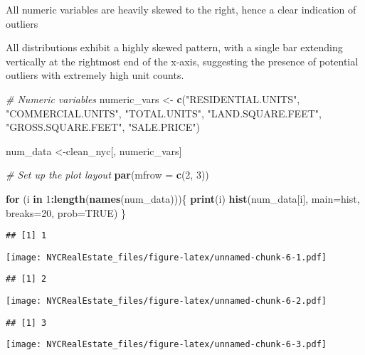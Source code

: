 \documentclass[
]{article}
\newenvironment{Shaded}{\begin{snugshade}}{\end{snugshade}}
\newcommand{\AttributeTok}[1]{\textcolor[rgb]{0.13,0.29,0.53}{#1}}
\newcommand{\CommentTok}[1]{\textcolor[rgb]{0.56,0.35,0.01}{\textit{#1}}}
\newcommand{\ConstantTok}[1]{\textcolor[rgb]{0.56,0.35,0.01}{#1}}
\newcommand{\ControlFlowTok}[1]{\textcolor[rgb]{0.13,0.29,0.53}{\textbf{#1}}}
\newcommand{\DecValTok}[1]{\textcolor[rgb]{0.00,0.00,0.81}{#1}}
\newcommand{\FunctionTok}[1]{\textcolor[rgb]{0.13,0.29,0.53}{\textbf{#1}}}
\newcommand{\NormalTok}[1]{#1}
\newcommand{\OtherTok}[1]{\textcolor[rgb]{0.56,0.35,0.01}{#1}}
\newcommand{\SpecialCharTok}[1]{\textcolor[rgb]{0.81,0.36,0.00}{\textbf{#1}}}
\newcommand{\StringTok}[1]{\textcolor[rgb]{0.31,0.60,0.02}{#1}}
\begin{document}
All numeric variables are heavily skewed to the right, hence a clear
indication of outliers

All distributions exhibit a highly skewed pattern, with a single bar
extending vertically at the rightmost end of the x-axis, suggesting the
presence of potential outliers with extremely high unit counts.

\begin{Shaded}
\begin{Highlighting}[]
\CommentTok{\# Numeric variables}
\NormalTok{numeric\_vars }\OtherTok{\textless{}{-}} \FunctionTok{c}\NormalTok{(}\StringTok{"RESIDENTIAL.UNITS"}\NormalTok{, }\StringTok{"COMMERCIAL.UNITS"}\NormalTok{, }\StringTok{"TOTAL.UNITS"}\NormalTok{, }
                  \StringTok{"LAND.SQUARE.FEET"}\NormalTok{, }\StringTok{"GROSS.SQUARE.FEET"}\NormalTok{, }\StringTok{"SALE.PRICE"}\NormalTok{)}


\NormalTok{num\_data }\OtherTok{\textless{}{-}}\NormalTok{clean\_nyc[, numeric\_vars]}

\CommentTok{\# Set up the plot layout}
\FunctionTok{par}\NormalTok{(}\AttributeTok{mfrow =} \FunctionTok{c}\NormalTok{(}\DecValTok{2}\NormalTok{, }\DecValTok{3}\NormalTok{))}

\ControlFlowTok{for}\NormalTok{ (i }\ControlFlowTok{in} \DecValTok{1}\SpecialCharTok{:}\FunctionTok{length}\NormalTok{(}\FunctionTok{names}\NormalTok{(num\_data)))\{}
  \FunctionTok{print}\NormalTok{(i)}
  \FunctionTok{hist}\NormalTok{(num\_data[i], }\AttributeTok{main=}\StringTok{\textquotesingle{}hist\textquotesingle{}}\NormalTok{, }\AttributeTok{breaks=}\DecValTok{20}\NormalTok{, }\AttributeTok{prob=}\ConstantTok{TRUE}\NormalTok{)}
\NormalTok{\}}
\end{Highlighting}
\end{Shaded}

\begin{verbatim}
## [1] 1
\end{verbatim}

\texttt{[image: NYCRealEstate\_files/figure-latex/unnamed-chunk-6-1.pdf]}

\begin{verbatim}
## [1] 2
\end{verbatim}

\texttt{[image: NYCRealEstate\_files/figure-latex/unnamed-chunk-6-2.pdf]}

\begin{verbatim}
## [1] 3
\end{verbatim}

\texttt{[image: NYCRealEstate\_files/figure-latex/unnamed-chunk-6-3.pdf]}
\end{document}
